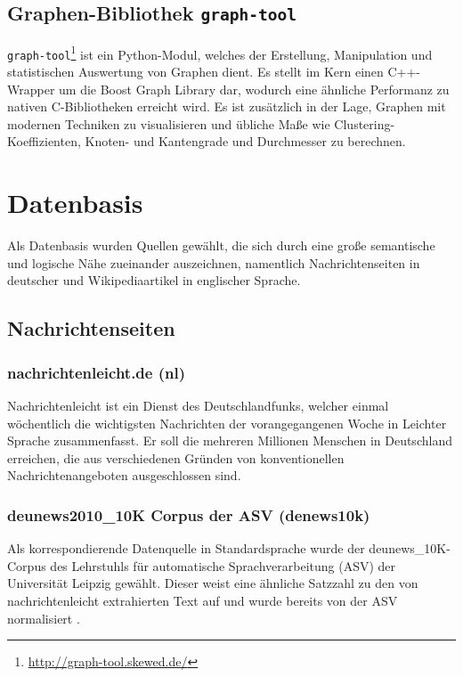 \documentclass[11pt, a4paper]{article}
\begin{document}
\subsection{Graphen-Bibliothek \texttt{graph-tool}}
\texttt{graph-tool}\footnote{\url{http://graph-tool.skewed.de/}} ist ein
Python-Modul, welches der Erstellung, Manipulation und statistischen
Auswertung von Graphen dient. Es stellt im Kern einen C++-Wrapper um die Boost
Graph Library dar, wodurch eine \"ahnliche Performanz zu nativen C-Bibliotheken
erreicht wird. Es ist zus\"atzlich in der Lage, Graphen mit modernen Techniken
zu visualisieren und \"ubliche Ma\ss{}e wie Clustering-Koeffizienten, Knoten-
und Kantengrade und Durchmesser zu berechnen.


\section{Datenbasis}
\label{sec:datenbasis}

Als Datenbasis wurden Quellen gew\"ahlt, die sich durch eine gro\ss{}e
semantische und logische N\"ahe zueinander auszeichnen, namentlich
Nachrichtenseiten in deutscher und Wikipediaartikel in englischer Sprache.

\subsection{Nachrichtenseiten}
\label{nrseiten}

\subsubsection{nachrichtenleicht.de (nl)}

Nachrichtenleicht ist ein Dienst des Deutschlandfunks, welcher einmal
w\"ochentlich die wichtigsten Nachrichten der vorangegangenen Woche in Leichter
Sprache zusammenfasst. Er soll die mehreren Millionen Menschen in Deutschland
erreichen, die aus verschiedenen Gr\"unden von konventionellen
Nachrichtenangeboten ausgeschlossen sind.

\subsubsection{deunews2010\_10K Corpus der ASV (denews10k)}

Als korrespondierende Datenquelle in Standardsprache wurde der
deunews\_10K-Corpus des Lehrstuhls f\"ur automatische Sprachverarbeitung
(ASV) der Universit\"at Leipzig gew\"ahlt. Dieser weist eine \"ahnliche Satzzahl
zu den von nachrichtenleicht extrahierten Text auf und wurde bereits von der ASV
normalisiert \cite{Quasthoff2006}.
\end{document}
